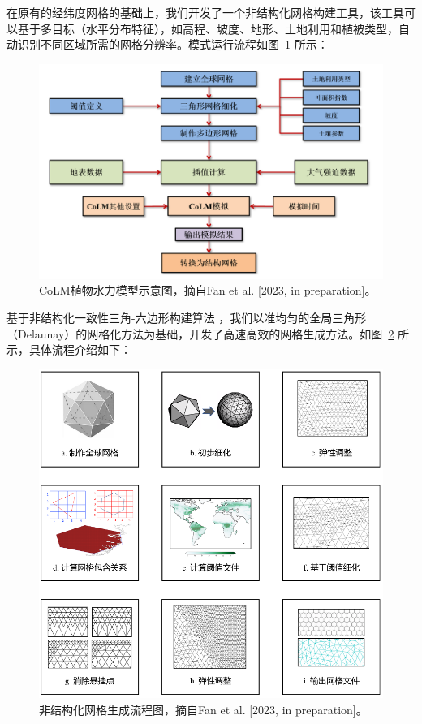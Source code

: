 在原有的经纬度网格的基础上，我们开发了一个非结构化网格构建工具，该工具可以基于多目标（水平分布特征），如高程、坡度、地形、土地利用和植被类型，自动识别不同区域所需的网格分辨率。模式运行流程如图~\ref{fig:非结构化网格CoLM总体运行流程图} 所示：
 {
\begin{figure}[]
\centering
\includegraphics{Figures/模式构架/非结构化网格CoLM总体运行流程图.png}
\caption{CoLM植物水力模型示意图，摘自Fan et al. [2023, in preparation]。}
\label{fig:非结构化网格CoLM总体运行流程图}
\end{figure}
}

基于非结构化一致性三角-六边形构建算法 \citep{fatichi2020soil,walko2008ocean,walko_direct_2011}，我们以准均匀的全局三角形（Delaunay）的网格化方法为基础，开发了高速高效的网格生成方法。如图~\ref{fig:非结构化网格生成流程图} 所示，具体流程介绍如下：
{
\begin{figure}[]
\centering
\includegraphics{Figures/模式构架/非结构化网格生成流程图.png}
\caption{非结构化网格生成流程图，摘自Fan et al. [2023, in preparation]。}
\label{fig:非结构化网格生成流程图}
\end{figure}
}

